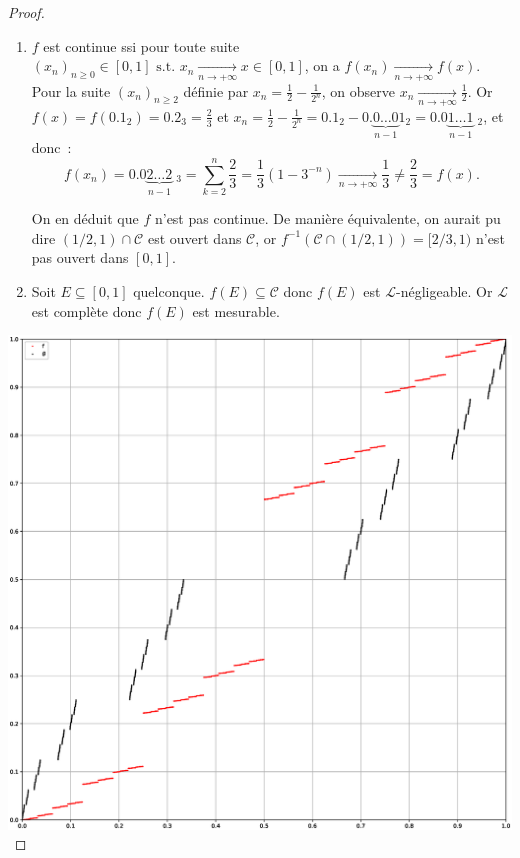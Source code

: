 \documentclass{article}
\newcommand{\pinfty}{{+\infty}}
\newcommand{\st}{\text{ s.t. }}
\begin{document}
\begin{proof}~
\begin{enumerate}
	\item $f$ est continue ssi pour toute suite $(x_n)_{n \geq 0} \in [0, 1] \st x_n \xrightarrow[n \to \pinfty]{} x \in [0, 1]$, on a $f(x_n) \xrightarrow[n \to \pinfty]{} f(x)$.
	Pour la suite $(x_n)_{n \geq 2}$ définie par $x_n = \frac 12 - \frac 1{2^n}$, on observe $x_n \xrightarrow[n \to \pinfty]{} \frac 12$. Or $f(x) = f(0.1_2) = 0.2_3 = \frac 23$ et
	$x_n = \frac 12 - \frac 1{2^n} = 0.1_2 - 0.\underbrace {0\ldots0}_{n-1}1_2 = 0.0\underbrace {1\ldots1}_{n-1}\phantom._2$, et donc~:
	\[f(x_n) = 0.0\underbrace {2\ldots2}_{n-1}\phantom._3 = \sum_{k=2}^n\frac 23 = \frac 13(1-3^{-n}) \xrightarrow[n \to \pinfty]{} \frac 13 \neq \frac 23 = f(x).\]

	On en déduit que $f$ n'est pas continue. De manière équivalente, on aurait pu dire $(1/2, 1) \cap \mathscr C$ est ouvert dans $\mathscr C$, or
	$f^{-1}(\mathscr C \cap (1/2, 1)) = [2/3, 1)$ n'est pas ouvert dans $[0, 1]$.

	\item Soit $E \subseteq [0, 1]$ quelconque. $f(E) \subseteq \mathscr C$ donc $f(E)$ est $\mathcal L$-négligeable. Or $\mathcal L$ est complète donc $f(E)$ est mesurable.
\end{enumerate}

\includegraphics[width=\textwidth]{cantor.eps}
\end{proof}
\end{document}
